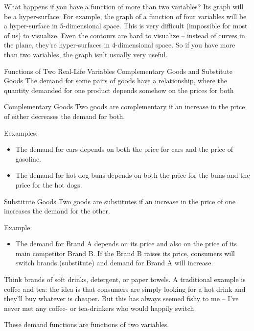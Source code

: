 What happens if you have a function of more than two variables? Its graph will be a hyper-surface. For example, the graph of a function of four variables will be a hyper-surface in 5-dimensional space. This is very difficult (impossible for most of us) to visualize. Even the contours are hard to visualize – instead of curves in the plane, they’re hyper-surfaces in 4-dimensional space. So if you have more than two variables, the graph isn't usually very useful.

Functions of Two Real-Life Variables
Complementary Goods and Substitute Goods
The demand for some pairs of goods have a relationship, where the quantity demanded for one product depends somehow on the prices for both

Complementary Goods
Two goods are complementary if an increase in the price of either decreases the demand for both.

Eexamples:
\begin{itemize}
  \item The demand for cars depends on both the price for cars and the price of gasoline.
  \item The demand for hot dog buns depends on both the price for the buns and the price for the hot dogs.
\end{itemize}
Substitute Goods
Two goods are substitutes if an increase in the price of one increases the demand for the other.

Example:
\begin{itemize}
  \item The demand for Brand A depends on its price and also on the price of its main competitor Brand B. If the Brand B raises its price, consumers will switch brands (substitute) and demand for Brand A will increase.
\end{itemize}
Think brands of soft drinks, detergent, or paper towels. A traditional example is coffee and tea: the idea is that consumers are simply looking for a hot drink and they'll buy whatever is cheaper. But this has always seemed fishy to me – I've never met any coffee- or tea-drinkers who would happily switch.

These demand functions are functions of two variables.

